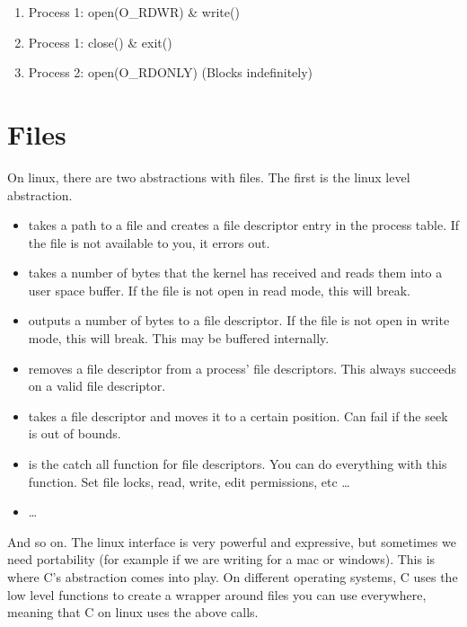 \begin{enumerate}
\item Process 1: open(O\_RDWR) \& write()
\item Process 1: close() \& exit()
\item Process 2: open(O\_RDONLY) (Blocks indefinitely) 
\end{enumerate}



\section{Files}

On linux, there are two abstractions with files. The first is the linux  level abstraction.

 \begin{itemize}
\item {} takes a path to a file and creates a file descriptor entry in the process table. If the file is not available to you, it errors out.
\item {} takes a number of bytes that the kernel has received and reads them into a user space buffer. If the file is not open in read mode, this will break.
\item {} outputs a number of bytes to a file descriptor. If the file is not open in write mode, this will break. This may be buffered internally.
\item {} removes a file descriptor from a process' file descriptors. This always succeeds on a valid file descriptor.
\item {} takes a file descriptor and moves it to a certain position. Can fail if the seek is out of bounds.
\item {} is the catch all function for file descriptors. You can do everything with this function. Set file locks, read, write, edit permissions, etc \ldots{}
\item \ldots{}
 \end{itemize}

And so on. The linux interface is very powerful and expressive, but sometimes we need portability (for example if we are writing for a mac or windows). This is where C's abstraction comes into play. On different operating systems, C uses the low level functions to create a wrapper around files you can use everywhere, meaning that C on linux uses the above calls.

